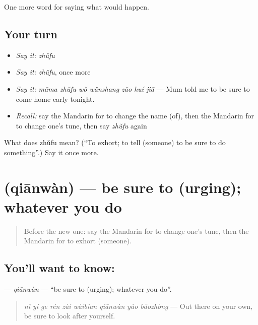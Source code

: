 \begin{grammarlens}[title={What you've built}]
One more word for saying what would happen.
\end{grammarlens}

\subsection*{Your turn}
\begin{itemize}
\raggedright
  \item \emph{Say it:} \emph{zhǔfu}
  \item \emph{Say it:} \emph{zhǔfu}, once more
  \item \emph{Say it:} \emph{māma zhǔfu wǒ wǎnshang zǎo huí jiā} — Mum told me to be sure to come home early tonight.
  \item \emph{Recall:} say the Mandarin for to change the name (of), then the Mandarin for to change one's tune, then say \emph{zhǔfu} again
\end{itemize}

\begin{tcolorbox}[breakable,colback=teal!4,colframe=teal!35!black,title={Before you move on}]
What does zhǔfu mean? (\textquotedblleft{}To exhort; to tell (someone) to be sure to do something\textquotedblright{}.) Say it once more.
\end{tcolorbox}
\section[\texorpdfstring{\zh{千万} (qiānwàn)}{千万 (qiānwàn)}]{ (qiānwàn) — be sure to (urging); whatever you do}

\label{lesson:ZH-C393-qianwan}



\begin{quote}
Before the new one: say the Mandarin for to change one's tune, then the Mandarin for to exhort (someone).
\end{quote}

\subsection*{You'll want to know: }
\textbf{} — \emph{qiānwàn} — \textquotedblleft{}be sure to (urging); whatever you do\textquotedblright{}.

\begin{quote}
\textbf{} \emph{nǐ yí ge rén zài wàibian qiānwàn yào bǎozhòng} — Out there on your own, be sure to look after yourself.
\end{quote}

